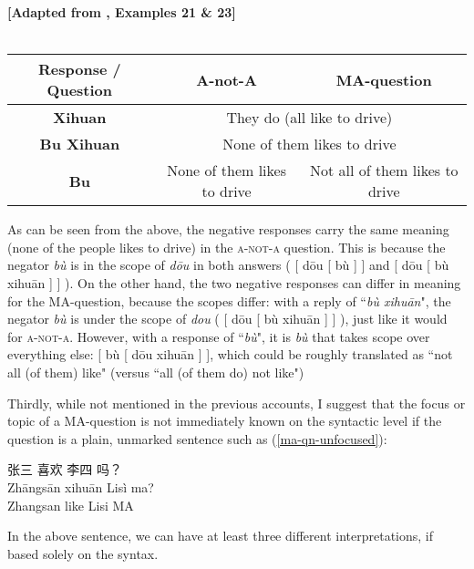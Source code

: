\documentclass[12pt, UTF8]{article}
\begin{document}
\begin{exe}
\ex\label{A-not-A-versus-MA-table} {
	\textbf{[Adapted from \cite{McCawley1994}, Examples 21 \& 23]}\\ \\
	\begin{tabular}{|c|c|c|}
	\hline
	\textbf{Response / Question} & \textbf{A-not-A} & \textbf{MA-question}\\
	\hline
	\textbf{Xihuan} & \multicolumn{2}{c|}{They do (all like to drive)}\\
	\hline
	\textbf{Bu Xihuan} & \multicolumn{2}{c|}{None of them likes to drive}\\
	\hline
	\textbf{Bu} & None of them likes to drive & Not all of them likes to drive \\
	\hline
	\end{tabular}
}
\end{exe}
\newpage
As can be seen from the above, the negative responses carry the same meaning (none of the people likes to drive) in the \textsc{a-not-a} question. This is because the negator \textit{b\`{u}} is in the scope of \textit{d\={o}u} in both answers ( [ d\={o}u [ b\`{u} ] ] and [ d\={o}u [ b\`{u} xihu\={a}n ] ] ). On the other hand, the two negative responses can differ in meaning for the MA-question, because the scopes differ: with a reply of ``\textit{b\`{u} xihu\={a}n}", the negator \textit{b\`{u}} is under the scope of \textit{dou} ( [ d\={o}u [ b\`{u} xihu\={a}n ] ] ), just like it would for \textsc{a-not-a}. However, with a response of ``\textit{b\`{u}}", it is \textit{b\`{u}} that takes scope over everything else: [ b\`{u} [ d\={o}u xihu\={a}n ] ], which could be roughly translated as ``not all (of them) like" (versus ``all (of them do) not like")

Thirdly, while not mentioned in the previous accounts, I suggest that the focus or topic of a MA-question is not immediately known on the syntactic level if the question is a plain, unmarked sentence such as (\ref{ma-qn-unfocused}):

\begin{exe}
\ex\label{ma-qn-unfocused} {
		\glll 
		张三 喜欢 李四 吗？\\ 
		Zh\={a}ngs\={a}n xihu\={a}n Lis\`{i} ma?\\
		Zhangsan like Lisi MA\\
	}
\end{exe}

In the above sentence, we can have at least three different interpretations, if based solely on the syntax.
\end{document}
